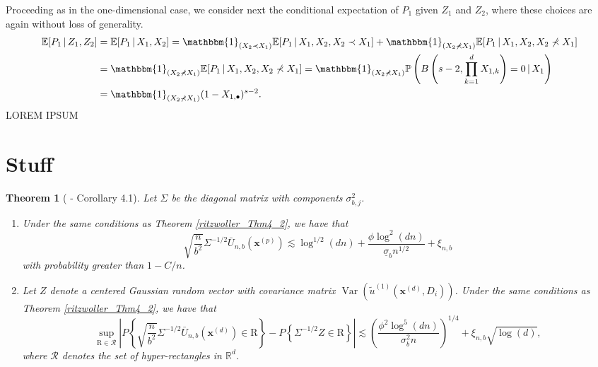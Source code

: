 \documentclass[letterpaper,10pt]{article}
\numberwithin{equation}{section}
\newtheorem{thm}{Theorem}
\numberwithin{thm}{section}
\newcommand{\1}{\mathbb{1}}
\begin{document}
Proceeding as in the one-dimensional case, we consider next the conditional expectation of $P_1$ given $Z_1$ and $Z_2$, where these choices are again without loss of generality.
\begin{equation*}
	\begin{aligned}
		\mathbb{E}[P_1 \, | \, Z_1, Z_2]
		 & = \mathbb{E}[P_1 \, | \, X_1, X_2]
		= \mathbbm{1}_{(X_2 \prec X_1)}\mathbb{E}[P_1 \, | \, X_1, X_2, X_2 \prec X_1] + \mathbbm{1}_{(X_2 \not\prec X_1)}\mathbb{E}[P_1 \, | \, X_1, X_2, X_2 \not\prec X_1] \\
		 & = \mathbbm{1}_{(X_2 \not\prec X_1)}\mathbb{E}[P_1 \, | \, X_1, X_2, X_2 \not\prec X_1]
		= \mathbbm{1}_{(X_2 \not\prec X_1)} \mathbb{P}\left(B\left(s - 2, \prod_{k = 1}^{d} X_{1,k}\right) = 0\, | \, X_1\right)                                              \\
		 & = \mathbbm{1}_{(X_2 \not\prec X_1)} (1- X_{1,\bullet})^{s-2}.
	\end{aligned}
\end{equation*}
{\color{red} LOREM IPSUM}

\section{Stuff}

\vspace{0.5cm}
\begin{thm}[\citet{ritzwoller_uniform_2024} - Corollary 4.1]
	Let $\Sigma$ be the diagonal matrix with components $\sigma_{b, j}^2$.
	\begin{enumerate}
		\item Under the same conditions as Theorem \ref{ritzwoller_Thm4_2}, we have that
		      \begin{equation}
			      \sqrt{\frac{n}{b^2}} \Sigma^{-1 / 2} \bar{U}_{n, b}\left(\mathbf{x}^{(p)}\right) \lesssim \log ^{1 / 2}(d n)+\frac{\phi \log ^2(d n)}{\underline{\sigma}_b n^{1 / 2}}+\xi_{n, b}
		      \end{equation}
		      with probability greater than $1-C / n$.
		\item Let $Z$ denote a centered Gaussian random vector with covariance matrix $\operatorname{Var}\left(\tilde{u}^{(1)}\left(\boldsymbol{x}^{(d)}, D_i\right)\right)$.
		      Under the same conditions as Theorem \ref{ritzwoller_Thm4_2}, we have that
		      \begin{equation}
			      \sup _{\mathrm{R} \in \mathcal{R}}\left|P\left\{\sqrt{\frac{n}{b^2}} \Sigma^{-1 / 2} \bar{U}_{n, b}\left(\boldsymbol{x}^{(d)}\right) \in \mathrm{R}\right\}-P\left\{\Sigma^{-1 / 2} Z \in \mathrm{R}\right\}\right|
			      \lesssim\left(\frac{\phi^2 \log ^5(d n)}{\sigma_b^2 n}\right)^{1 / 4}+\xi_{n, b} \sqrt{\log (d)},
		      \end{equation}
		      where $\mathcal{R}$ denotes the set of hyper-rectangles in $\mathbb{R}^d$.
	\end{enumerate}
\end{thm}
\end{document}
